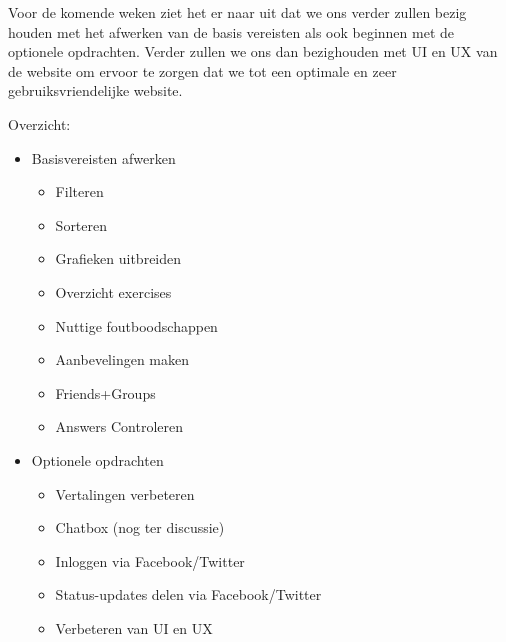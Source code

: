 Voor de komende weken ziet het er naar uit dat we ons verder zullen bezig houden met het afwerken van de basis 
vereisten als ook beginnen met de optionele opdrachten. Verder zullen we ons dan bezighouden met UI en UX van de
website om ervoor te zorgen dat we tot een optimale en zeer gebruiksvriendelijke website.

Overzicht:
\begin{itemize}
	\item Basisvereisten afwerken
	\begin{itemize}
		\item Filteren
		\item Sorteren
		\item Grafieken uitbreiden
		\item Overzicht exercises
		\item Nuttige foutboodschappen
		\item Aanbevelingen maken
		\item Friends+Groups
		\item Answers Controleren
	\end{itemize}
	\item Optionele opdrachten
	\begin{itemize}
		\item Vertalingen verbeteren
		\item Chatbox (nog ter discussie)
		\item Inloggen via Facebook/Twitter
		\item Status-updates delen via Facebook/Twitter
		\item Verbeteren van UI en UX
	\end{itemize}
\end{itemize}

